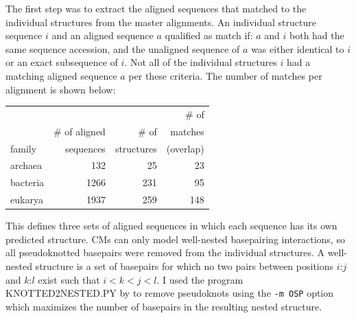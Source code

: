 The first step was to extract the aligned sequences that matched to
the individual structures from the master alignments.  An individual
structure sequence $i$ and an aligned sequence $a$ qualified as match
if: $a$ and $i$ both had the same sequence accession, and the
unaligned sequence of $a$ was either identical to $i$ or an exact
subsequence of $i$.  Not all of the individual structures $i$ had a
matching aligned sequence $a$ per these criteria.  The number of
matches per alignment is shown below:

\begin{center}
\begin{tabular}{l|r|r|r}
             &               &            & \# of   \\ 
             & \# of aligned & \# of      & matches  \\ 
family       & sequences     & structures & (overlap) \\ \hline%
archaea      &           132 &         25 &  23      \\%
bacteria     &          1266 &        231 &  95      \\%
eukarya      &          1937 &        259 & 148      \\%
\end{tabular}
\end{center}

This defines three sets of aligned sequences in which each sequence 
has its own predicted structure. CMs can only model well-nested
basepairing interactions, so all pseudoknotted basepairs
were removed from the individual structures. A well-nested structure
is a set of basepairs for which no two pairs between positions $i$:$j$
and $k$:$l$ exist such that $i<k<j<l$. I used the program
KNOTTED2NESTED.PY by \cite{Smit08} to remove
pseudoknots using the \texttt{-m OSP} option which maximizes the number
of basepairs in the resulting nested structure.

